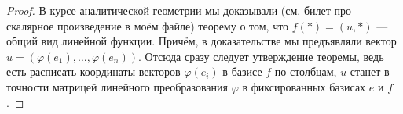 \begin{proof}
    В курсе аналитической геометрии мы доказывали (см. билет про скалярное произведение в моём файле) теорему о том, что $f(\ast) = (u, \ast)$ --- общий вид линейной функции. Причём, в доказательстве мы предъявляли вектор $u = (\varphi(e_1), \ldots, \varphi(e_n))$. Отсюда сразу следует утверждение теоремы, ведь есть расписать координаты векторов $\varphi(e_i)$ в базисе $f$ по столбцам, $u$ станет в точности матрицей линейного преобразования $\varphi$ в фиксированных базисах $e$ и $f$.
\end{proof}




